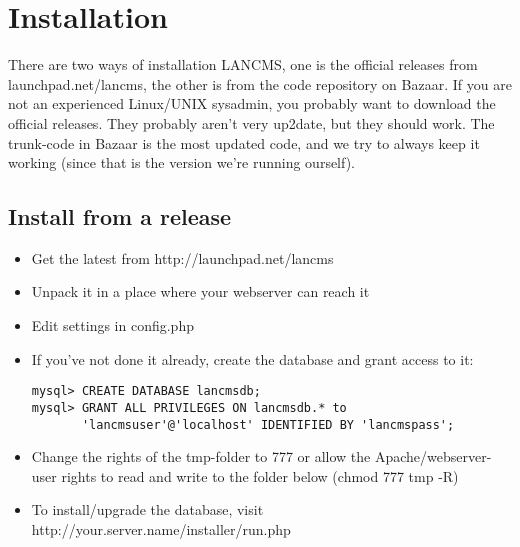 \chapter{Installation}

There are two ways of installation LANCMS, one is the official releases from launchpad.net/lancms, the other is from the code repository on Bazaar.
If you are not an experienced Linux/UNIX sysadmin, you probably want to download the official releases. They probably aren't very up2date, but they should work.
The trunk-code in Bazaar is the most updated code, and we try to always keep it working (since that is the version we're running ourself).

\section{Install from a release}
\begin{itemize}
\item Get the latest from http://launchpad.net/lancms
\item Unpack it in a place where your webserver can reach it
\item Edit settings in config.php
\item If you've not done it already, create the database and grant access to it:
\begin{lstlisting}
mysql> CREATE DATABASE lancmsdb;
mysql> GRANT ALL PRIVILEGES ON lancmsdb.* to
       'lancmsuser'@'localhost' IDENTIFIED BY 'lancmspass';
\end{lstlisting}
\item Change the rights of the tmp-folder to 777 or allow the Apache/webserver-user rights to read and write to the folder below (chmod 777 tmp -R)
\item To install/upgrade the database, visit http://your.server.name/installer/run.php
\end{itemize}

